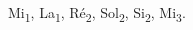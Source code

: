 \documentclass[12pt,a4paper]{article}
\begin{document}
\begin{multicols}{2}
\begin{doc}
\begin{center}
Mi\textsubscript{1}, La\textsubscript{1}, Ré\textsubscript{2}, Sol\textsubscript{2}, Si\textsubscript{2}, Mi\textsubscript{3}.
\end{center}
\end{doc}
\end{multicols}
\end{document}
